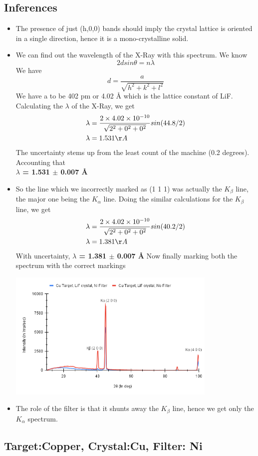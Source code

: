 \documentclass[]{report}[12 pt]
\begin{document}
\subsection*{Inferences}
\begin{itemize}
	\item The presence of just (h,0,0) bands should imply the crystal lattice is oriented in a single direction, hence it is a mono-crystalline solid.
	\item We can find out the wavelength of the X-Ray with this spectrum.
	We know\\
	\begin{equation*}
		2dsin\theta=n\lambda
	\end{equation*}
	We have 
	\[d=\frac{a}{\sqrt{h^2+k^2+l^2}}\]
	We have a to be 402 pm or 4.02 {\AA}  which is the lattice constant of LiF.
	Calculating the $\lambda$ of the X-Ray, we get
	\begin{align*}
		\lambda &= \frac{2\times4.02\times10^{-10}}{\sqrt{2^2+0^2+0^2}} sin(44.8/2)\\
		\lambda &= 1.531 {\AA}
	\end{align*}
	The uncertainty stems up from the least count of the machine (0.2 degrees). Accounting that\\
	\textbf{$\lambda$ = 1.531 $\pm$ 0.007 \AA}
	\item So the line which we incorrectly marked as (1 1 1) was actually the $K_{\beta}$ line, the major one being the $K_{\alpha}$ line. Doing the similar calculations for the $K_{\beta}$  line, we get
	\begin{align*}
		\lambda &= \frac{2\times4.02\times10^{-10}}{\sqrt{2^2+0^2+0^2}} sin(40.2/2)\\
		\lambda &= 1.381 {\AA}
	\end{align*}
	With uncertainty, \textbf{$\lambda$ = 1.381 $\pm$ 0.007 \AA}
	Now finally marking both the spectrum with the correct markings
	\begin{center}
		\includegraphics[width=10cm]{a2.png}
	\end{center}
	\item The role of the filter is that it shunts away the $K_{\beta}$ line, hence we get only the $K_{\alpha} $ spectrum.
\end{itemize}

\subsection*{Target:Copper, Crystal:Cu, Filter: Ni}
\end{document}
